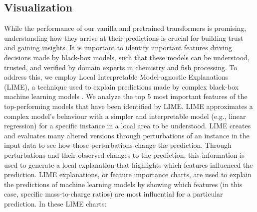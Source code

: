 \subsection{Visualization} 


While the performance of our vanilla and pretrained transformers is promising, understanding how they arrive at their predictions is crucial for building trust and gaining insights. 
It is important to identify important features driving decisions made by black-box models, such that these models can be understood, trusted, and verified by domain experts in chemistry and fish processing.
To address this, we employ Local Interpretable Model-agnostic Explanations (LIME), a technique used to explain predictions made by complex black-box machine learning models \citep{Ribeiro2016}.
We analyze the top 5 most important features of the top-performing models that have been identified by LIME.
LIME approximates a complex model's behaviour with a simpler and interpretable model (e.g., linear regression) for a specific instance in a local area to be understood. 
LIME creates and evaluates many altered versions through perturbations of an instance in the input data to see how those perturbations change the prediction. 
Through perturbations and their observed changes to the prediction, this information is used to generate a local explanation that highlights which features influenced the prediction. 
LIME explanations, or feature importance charts, are used to explain the predictions of machine learning models by showing which features (in this case, specific mass-to-charge ratios) are most influential for a particular prediction.
In these LIME charts:

